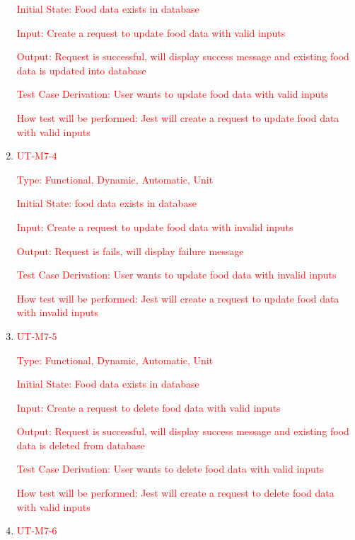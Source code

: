 \documentclass[12pt, titlepage]{article}
\begin{document}
\begin{enumerate}
	\textcolor{red}{Initial State: Food data exists in database}

	\textcolor{red}{Input: Create a request to update food data with valid inputs}

	\textcolor{red}{Output: Request is successful, will display success message and existing food data is updated into database}

	\textcolor{red}{Test Case Derivation: User wants to update food data with valid inputs}

	\textcolor{red}{How test will be performed: Jest will create a request to update food data with valid inputs}

        \item{\textcolor{red}{UT-M7-4\\}}

	\textcolor{red}{Type: Functional, Dynamic, Automatic, Unit}

	\textcolor{red}{Initial State: food data exists in database}

	\textcolor{red}{Input: Create a request to update food data with invalid inputs}

	\textcolor{red}{Output: Request is fails, will display failure message}

	\textcolor{red}{Test Case Derivation: User wants to update food data with invalid inputs}

	\textcolor{red}{How test will be performed: Jest will create a request to update food data with invalid inputs}

    \item{\textcolor{red}{UT-M7-5\\}}

	\textcolor{red}{Type: Functional, Dynamic, Automatic, Unit}

	\textcolor{red}{Initial State: Food data exists in database}

	\textcolor{red}{Input: Create a request to delete food data with valid inputs}

	\textcolor{red}{Output: Request is successful, will display success message and existing food data is deleted from database}

	\textcolor{red}{Test Case Derivation: User wants to delete food data with valid inputs}

 \textcolor{red}{How test will be performed: Jest will create a request to delete food data with valid inputs}

         \item{\textcolor{red}{UT-M7-6\\}}


\end{enumerate}
\end{document}
